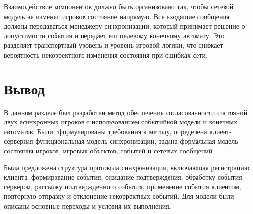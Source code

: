 Взаимодействие компонентов должно быть организовано так, чтобы сетевой модуль не изменял игровое состояние напрямую. Все входящие сообщения должны передаваться менеджеру синхронизации, который принимает решение о допустимости события и передает его целевому конечному автомату. Это разделяет транспортный уровень и уровень игровой логики, что снижает вероятность некорректного изменения состояния при ошибках сети.


\section*{Вывод}

В данном разделе был разработан метод обеспечения согласованности состояний двух асинхронных игроков с использованием событийной модели и конечных автоматов. 
Были сформулированы требования к методу, определена клиент-серверная функциональная модель синхронизации, задана формальная модель состояния игроков, игровых объектов, событий и сетевых сообщений.

Была предложена структура протокола синхронизации, включающая регистрацию клиента, формирование события, 
ожидание подтверждения, обработку события сервером, рассылку подтвержденного события, применение события клиентом, повторную отправку и отклонение некорректных событий. 
Для модели были описаны основные переходы и условия их выполнения.

